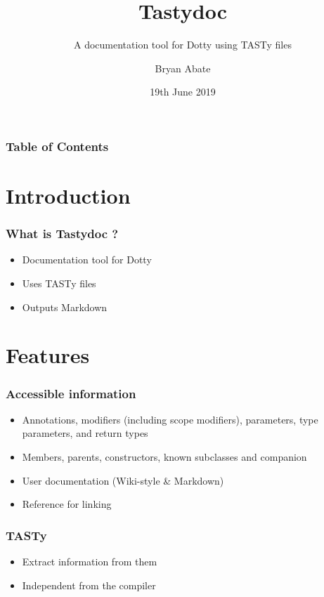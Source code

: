 \documentclass{beamer}
\title{Tastydoc}
\subtitle{A documentation tool for Dotty using TASTy files}
\author{Bryan Abate}
\date{19th June 2019}
\begin{document}
 
\frame{\titlepage}

\begin{frame}
  \frametitle{Table of Contents}
  \tableofcontents
\end{frame}


\section{Introduction}

\begin{frame}
  \frametitle{What is Tastydoc ?}
  \begin{itemize}
    \item Documentation tool for Dotty
    \item Uses TASTy files
    \item Outputs Markdown
  \end{itemize}
\end{frame}
 
\section{Features}

\begin{frame}
  \frametitle{Accessible information}
  \begin{itemize}
    \item Annotations, modifiers (including scope modifiers), parameters, type parameters, and return types
    \item Members, parents, constructors, known subclasses and companion
    \item User documentation (Wiki-style \& Markdown)
    \item Reference for linking
  \end{itemize}
\end{frame}

\begin{frame}
  \frametitle{TASTy}
  \begin{itemize}
    \item Extract information from them
    \item Independent from the compiler
  \end{itemize}
\end{frame}
\end{document}

